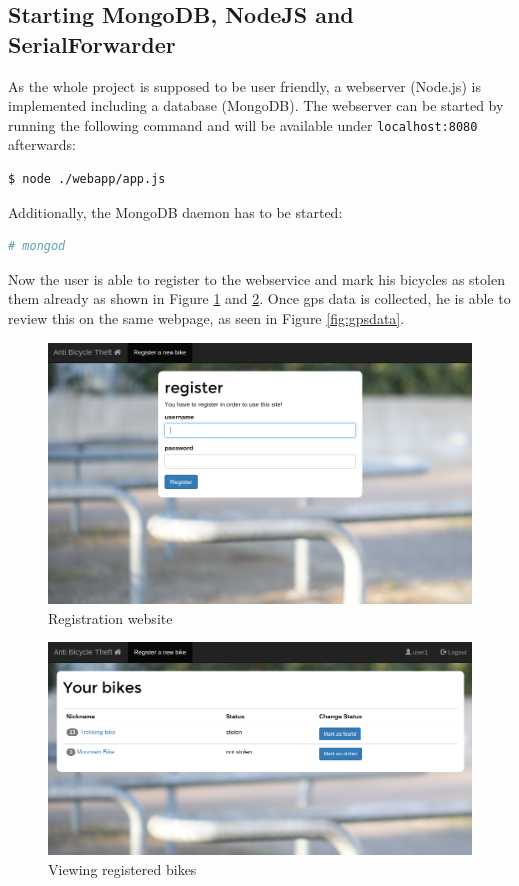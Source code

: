 \documentclass[a4paper]{article}
\begin{document}
\subsection{Starting MongoDB, NodeJS and SerialForwarder}
As the whole project is supposed to be user friendly, a webserver (Node.js) is implemented including a database (MongoDB).
The webserver can be started by running the following command and will be available under \texttt{localhost:8080} afterwards:
\begin{lstlisting}[frame=single,language=bash]
$ node ./webapp/app.js
\end{lstlisting}
Additionally, the MongoDB daemon has to be started:
\begin{lstlisting}[frame=single,language=bash]
# mongod
\end{lstlisting}
Now the user is able to register to the webservice and mark his bicycles as stolen them already as shown in Figure \ref{fig:webregistration} and \ref{fig:mark}. Once gps data is collected, he is able to review this on the same webpage, as seen in Figure \ref{fig:gpsdata}.
\begin{figure}[h!]
\begin{center}
\includegraphics[scale=0.3]{pics/reg.png}
\end{center}
\caption{Registration website}
\label{fig:webregistration}
\end{figure}
\begin{figure}
\begin{center}
\includegraphics[scale=0.3]{pics/mark.png}
\end{center}
\caption{Viewing registered bikes}
\label{fig:mark}
\end{figure}
\end{document}
